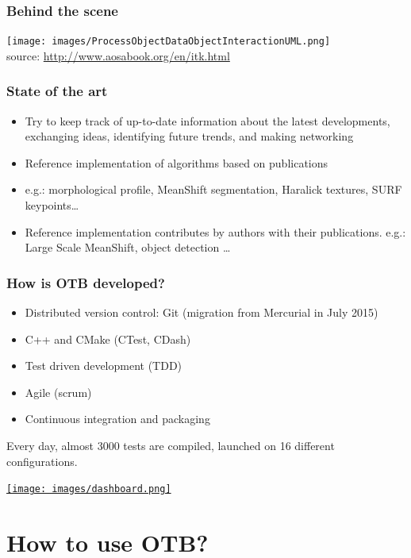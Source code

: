 \documentclass[8pt]{beamer}
\begin{document}
\begin{frame}
\frametitle{Behind the scene}
\begin{center}
\texttt{[image: images/ProcessObjectDataObjectInteractionUML.png]}\\
\tiny{source: \url{http://www.aosabook.org/en/itk.html}}
\end{center}
\end{frame}

\begin{frame}
\frametitle{State of the art}
\begin{itemize}
\item Try to keep track of up-to-date information about the latest developments, exchanging ideas, identifying future trends, and making networking
\item Reference implementation of algorithms based on publications
\item e.g.: morphological profile, MeanShift segmentation, Haralick textures, SURF keypoints\ldots
\item Reference implementation contributes by authors with their
  publications. e.g.: Large Scale MeanShift, object detection \ldots
\end{itemize}
\end{frame}

\begin{frame}
\frametitle{How is OTB developed?}
\vspace{-0.5cm}
\begin{itemize}
\item Distributed version control: Git (migration from Mercurial in July 2015)
\item C++ and CMake (CTest, CDash)
\item Test driven development (TDD)
\item Agile (scrum)
\item Continuous integration and packaging
\end{itemize}
Every day, almost 3000 tests are compiled, launched on 16 different
configurations.
\begin{center}
\href{http://dash.orfeo-toolbox.org/index.php?project=OTB}{\texttt{[image: images/dashboard.png]}}
\end{center}
\end{frame}

\section{How to use OTB?}
\end{document}
